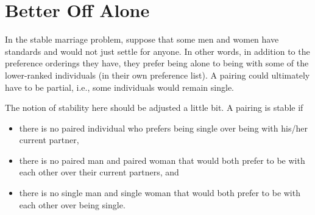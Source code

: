 \documentclass[11pt]{article}
\newcommand*{\Question}[1]{\section{#1}}
\begin{document}
\Question{Better Off Alone}

In the stable marriage problem, suppose that some men and women have standards and would not just settle
for anyone. In other words, in addition to the preference orderings they have,
they prefer being alone to being with some of the lower-ranked individuals
(in their own preference list). A pairing could ultimately have to be partial, i.e., some individuals would
remain single.

The notion of stability here should
be adjusted a little bit. A pairing is stable if
\begin{itemize}
\item there is no paired individual who prefers being single over being with his/her current partner,
\item there is no paired man and paired woman that would both prefer to be with each other over their current partners, and
\item there is no single man and single woman that would both prefer to be with each other over being single. 
\end{itemize} 
\end{document}

